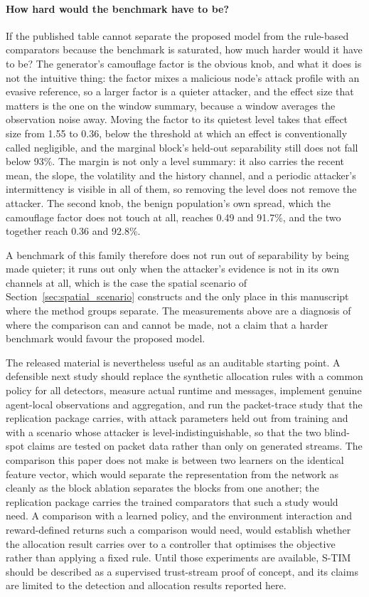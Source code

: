 \documentclass[notspecified,article,submit,moreauthors]{Definitions/mdpi}
\begin{document}
\paragraph{How hard would the benchmark have to be?}
If the published table cannot separate the proposed model from the rule-based comparators because the benchmark is saturated, how much harder would it have to be? The generator's camouflage factor is the obvious knob, and what it does is not the intuitive thing: the factor mixes a malicious node's attack profile with an evasive reference, so a larger factor is a quieter attacker, and the effect size that matters is the one on the window summary, because a window averages the observation noise away. Moving the factor to its quietest level takes that effect size from 1.55 to 0.36, below the threshold at which an effect is conventionally called negligible, and the marginal block's held-out separability still does not fall below 93\%. The margin is not only a level summary: it also carries the recent mean, the slope, the volatility and the history channel, and a periodic attacker's intermittency is visible in all of them, so removing the level does not remove the attacker. The second knob, the benign population's own spread, which the camouflage factor does not touch at all, reaches 0.49 and 91.7\%, and the two together reach 0.36 and 92.8\%.

A benchmark of this family therefore does not run out of separability by being made quieter; it runs out only when the attacker's evidence is not in its own channels at all, which is the case the spatial scenario of Section~\ref{sec:spatial_scenario} constructs and the only place in this manuscript where the method groups separate. The measurements above are a diagnosis of where the comparison can and cannot be made, not a claim that a harder benchmark would favour the proposed model.

The released material is nevertheless useful as an auditable starting point. A defensible next study should replace the synthetic allocation rules with a common policy for all detectors, measure actual runtime and messages, implement genuine agent-local observations and aggregation, and run the packet-trace study that the replication package carries, with attack parameters held out from training and with a scenario whose attacker is level-indistinguishable, so that the two blind-spot claims are tested on packet data rather than only on generated streams. The comparison this paper does not make is between two learners on the identical feature vector, which would separate the representation from the network as cleanly as the block ablation separates the blocks from one another; the replication package carries the trained comparators that such a study would need. A comparison with a learned policy, and the environment interaction and reward-defined returns such a comparison would need, would establish whether the allocation result carries over to a controller that optimises the objective rather than applying a fixed rule. Until those experiments are available, S-TIM should be described as a supervised trust-stream proof of concept, and its claims are limited to the detection and allocation results reported here.
\end{document}
